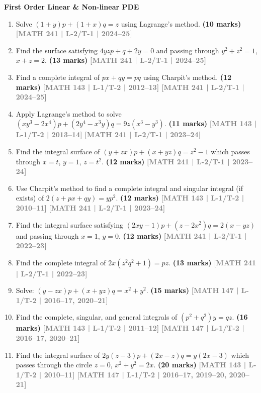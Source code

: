 \documentclass[12pt,a3paper]{article}
\newcommand{\yr}[1]{\hfill\textcolor{gray}{\small\textbf{[#1]}}}
\newcommand{\mk}[1]{\textcolor{orange!70!black}{\small\textbf{(#1 marks)}}}
\newcommand{\subtopic}[2]{%
  \vspace{10pt}
  \noindent\begin{tcolorbox}[colback=#1!8,colframe=#1,boxrule=0.6pt,arc=4pt,
    left=6pt,right=6pt,top=4pt,bottom=4pt]
    \small\bfseries\textcolor{#1}{#2}
  \end{tcolorbox}
  \vspace{2pt}
}
\begin{document}
\subtopic{cF}{First Order Linear \& Non-linear PDE}
\label{sub:s6-first}

\begin{enumerate}

\item Solve $(1+y)p+(1+x)q=z$ using Lagrange's method.
\mk{10} \yr{MATH 241 | L-2/T-1 | 2024--25}


\item Find the surface satisfying $4yzp+q+2y=0$ and passing through $y^{2}+z^{2}=1$, $x+z=2$.
\mk{13} \yr{MATH 241 | L-2/T-1 | 2024--25}


\item Find a complete integral of $px+qy=pq$ using Charpit's method.
\mk{12} \yr{MATH 143 | L-1/T-2 | 2012--13} \yr{MATH 241 | L-2/T-1 | 2024--25}


\item Apply Lagrange's method to solve $(xy^{3}-2x^{4})p+(2y^{4}-x^{3}y)q=9z(x^{3}-y^{3})$.
\mk{11} \yr{MATH 143 | L-1/T-2 | 2013--14} \yr{MATH 241 | L-2/T-1 | 2023--24}


\item Find the integral surface of $(y+zx)p+(x+yz)q=z^{2}-1$ which passes through $x=t$, $y=1$, $z=t^{2}$.
\mk{12} \yr{MATH 241 | L-2/T-1 | 2023--24}


\item Use Charpit's method to find a complete integral and singular integral (if exists) of $2(z+px+qy)=yp^{2}$.
\mk{12} \yr{MATH 143 | L-1/T-2 | 2010--11} \yr{MATH 241 | L-2/T-1 | 2023--24}


\item Find the integral surface satisfying $(2xy-1)p+(z-2x^{2})q=2(x-yz)$ and passing through $x=1$, $y=0$.
\mk{12} \yr{MATH 241 | L-2/T-1 | 2022--23}


\item Find the complete integral of $2x(z^{2}q^{2}+1)=pz$.
\mk{13} \yr{MATH 241 | L-2/T-1 | 2022--23}


\item Solve: $(y-zx)p+(x+yz)q=x^{2}+y^{2}$.
\mk{15} \yr{MATH 147 | L-1/T-2 | 2016--17, 2020--21}


\item Find the complete, singular, and general integrals of $(p^{2}+q^{2})y=qz$.
\mk{16} \yr{MATH 143 | L-1/T-2 | 2011--12} \yr{MATH 147 | L-1/T-2 | 2016--17, 2020--21}


\item Find the integral surface of $2y(z-3)p+(2x-z)q=y(2x-3)$ which passes through the circle $z=0$, $x^{2}+y^{2}=2x$.
\mk{20} \yr{MATH 143 | L-1/T-2 | 2010--11} \yr{MATH 147 | L-1/T-2 | 2016--17, 2019--20, 2020--21}



\end{enumerate}
\end{document}
